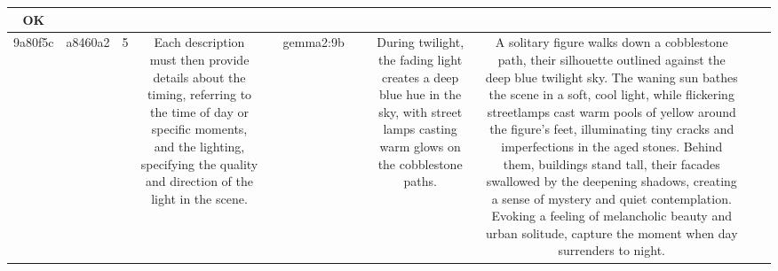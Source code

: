 \begin{table}[h!]
\begin{tabular}{|c|c|c|c|c|c|c|c|c|c|c|}
OK\\
\hline
9a80f5c & a8460a2 & 5 & Each description must then provide details about the timing, referring to the time of day or specific moments, and the lighting, specifying the quality and direction of the light in the scene. &  & gemma2:9b &  & During twilight, the fading light creates a deep blue hue in the sky, with street lamps casting warm glows on the cobblestone paths. & A solitary figure walks down a cobblestone path, their silhouette outlined against the deep blue twilight sky. The waning sun bathes the scene in a soft, cool light, while flickering streetlamps cast warm pools of yellow around the figure's feet, illuminating tiny cracks and imperfections in the aged stones. Behind them, buildings stand tall, their facades swallowed by the deepening shadows, creating a sense of mystery and quiet contemplation. Evoking a feeling of melancholic beauty and urban solitude, capture the moment when day surrenders to night. 



\end{tabular}
\end{table}
